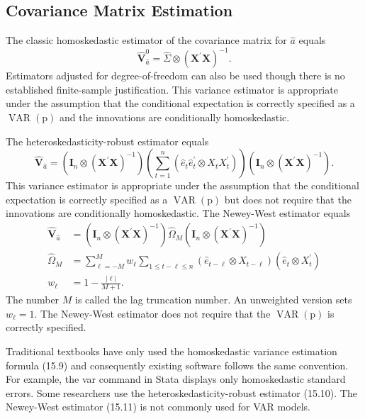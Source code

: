 \documentclass[10pt]{article}
\begin{document}
\subsection{Covariance Matrix Estimation}
The classic homoskedastic estimator of the covariance matrix for $\widehat{a}$ equals
$$
\widehat{\boldsymbol{V}}_{\widehat{a}}^{0}=\widehat{\Sigma} \otimes\left(\boldsymbol{X}^{\prime} \boldsymbol{X}\right)^{-1} .
$$
Estimators adjusted for degree-of-freedom can also be used though there is no established finite-sample justification. This variance estimator is appropriate under the assumption that the conditional expectation is correctly specified as a $\operatorname{VAR}(\mathrm{p})$ and the innovations are conditionally homoskedastic.

The heteroskedasticity-robust estimator equals
$$
\widehat{\boldsymbol{V}}_{\widehat{a}}=\left(\boldsymbol{I}_{n} \otimes\left(\boldsymbol{X}^{\prime} \boldsymbol{X}\right)^{-1}\right)\left(\sum_{t=1}^{n}\left(\widehat{e}_{t} \widehat{e}_{t}^{\prime} \otimes X_{t} X_{t}^{\prime}\right)\right)\left(\boldsymbol{I}_{n} \otimes\left(\boldsymbol{X}^{\prime} \boldsymbol{X}\right)^{-1}\right) .
$$
This variance estimator is appropriate under the assumption that the conditional expectation is correctly specified as a $\operatorname{VAR}(\mathrm{p})$ but does not require that the innovations are conditionally homoskedastic. The Newey-West estimator equals
$$
\begin{aligned}
\widehat{\boldsymbol{V}}_{\widehat{a}} &=\left(\boldsymbol{I}_{n} \otimes\left(\boldsymbol{X}^{\prime} \boldsymbol{X}\right)^{-1}\right) \widehat{\Omega}_{M}\left(\boldsymbol{I}_{n} \otimes\left(\boldsymbol{X}^{\prime} \boldsymbol{X}\right)^{-1}\right) \\
\widehat{\Omega}_{M} &=\sum_{\ell=-M}^{M} w_{\ell} \sum_{1 \leq t-\ell \leq n}\left(\widehat{e}_{t-\ell} \otimes X_{t-\ell}\right)\left(\widehat{e}_{t} \otimes X_{t}^{\prime}\right) \\
w_{\ell} &=1-\frac{|\ell|}{M+1} .
\end{aligned}
$$
The number $M$ is called the lag truncation number. An unweighted version sets $w_{\ell}=1$. The Newey-West estimator does not require that the $\operatorname{VAR}(\mathrm{p})$ is correctly specified.

Traditional textbooks have only used the homoskedastic variance estimation formula (15.9) and consequently existing software follows the same convention. For example, the var command in Stata displays only homoskedastic standard errors. Some researchers use the heteroskedasticity-robust estimator (15.10). The Newey-West estimator (15.11) is not commonly used for VAR models.
\end{document}
